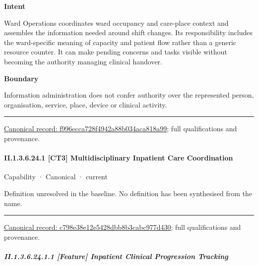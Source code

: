 \textbf{Intent}



Ward Operations coordinates ward occupancy and care-place context and assembles the information needed around shift changes. Its responsibility includes the ward-specific meaning of capacity and patient flow rather than a generic resource counter. It can make pending concerns and tasks visible without becoming the authority managing clinical handover.



\textbf{Boundary}



Information administration does not confer authority over the represented person, organisation, service, place, device or clinical activity.



\medskip\hrule\medskip

{\footnotesize \href{../../../../../../../continuum/strategy/capability/f996ecca728f4942a88b034aca818a99.md}{Canonical record: f996ecca728f4942a88b034aca818a99}; full qualifications and provenance.}\par
\paragraph*{II.1.3.6.24.1 [CT3] Multidisciplinary Inpatient Care Coordination}
\label{navigation:II.1.3.6.24.1}

\label{element:c798e38e12e5428dbb8b3cabc977d430}
{\small Capability · Canonical · current}\par

Definition unresolved in the baseline. No definition has been synthesised from the name.



\medskip\hrule\medskip

{\footnotesize \href{../../../../../../../continuum/strategy/capability/c798e38e12e5428dbb8b3cabc977d430.md}{Canonical record: c798e38e12e5428dbb8b3cabc977d430}; full qualifications and provenance.}\par
\subparagraph*{II.1.3.6.24.1.1 [Feature] Inpatient Clinical Progression Tracking}
\label{navigation:II.1.3.6.24.1.1}

